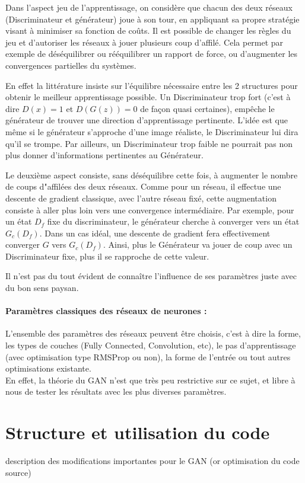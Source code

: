 		Dans l'aspect jeu de l'apprentissage, on considère que chacun des deux réseaux (Discriminateur et générateur) joue à son tour, en appliquant sa propre stratégie visant à minimiser sa fonction de coûts. Il est possible de changer les règles du jeu et d'autoriser les réseaux à jouer plusieurs coup d'affilé. Cela permet par exemple de déséquilibrer ou rééquilibrer un rapport de force, ou d'augmenter les convergences partielles du systèmes.

		En effet la littérature insiste sur l'équilibre nécessaire entre les 2 structures pour obtenir le meilleur apprentissage possible. Un Discriminateur trop fort (c'est à dire $D(x) = 1 $ et $ D(G(z)) = 0$ de façon quasi certaines), empêche le générateur de trouver une direction d'apprentissage pertinente. L'idée est que même si le générateur s'approche d'une image réaliste, le Discriminateur lui dira qu'il se trompe. Par ailleurs, un Discriminateur trop faible ne pourrait pas non plus donner d'informations pertinentes au Générateur.

		Le deuxième aspect consiste, sans déséquilibre cette fois, à augmenter le nombre de coups 	d"affilées des deux réseaux. Comme pour un réseau, il effectue une descente de gradient classique, avec l'autre réseau fixé, cette augmentation consiste à aller plus loin vers une convergence intermédiaire. Par exemple, pour un état $D_f$ fixe du discriminateur, le générateur cherche à converger vers un état $G_c(D_f)$. Dans un cas idéal, une descente de gradient fera effectivement converger $G$ vers $G_c(D_f)$. Ainsi, plus le Générateur va jouer de coup avec un Discriminateur fixe, plus il se rapproche de cette valeur. 

		Il n'est pas du tout évident de connaître l'influence de ses paramètres juste avec du bon sens paysan.


	\paragraph*{Paramètres classiques des réseaux de neurones : }
		L'ensemble des paramètres des réseaux peuvent être choisis, c'est à dire la forme, les types de couches (Fully Connected, Convolution, etc), le pas d'apprentissage (avec optimisation type RMSProp ou non), la forme de l'entrée ou tout autres optimisations existante. \\
		En effet, la théorie du GAN n'est que très peu restrictive sur ce sujet, et libre à nous de tester les résultats avec les plus diverses paramètres. 

\section{Structure et utilisation du code}
	{description des modifications importantes pour le GAN (or optimisation du code source)}


